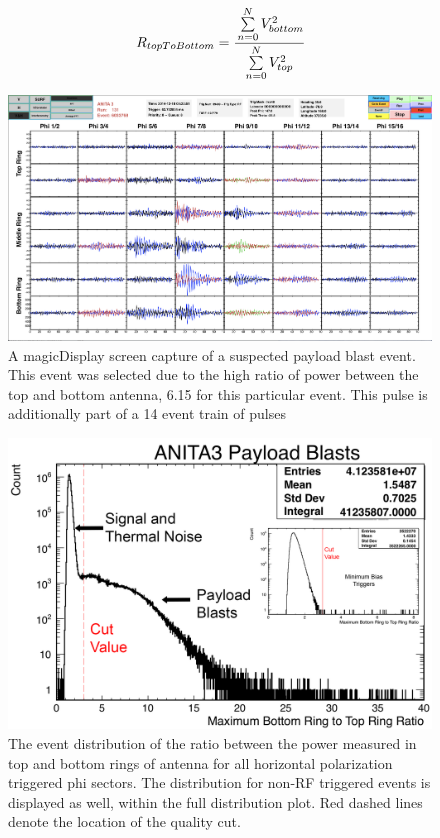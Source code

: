 \begin{equation}
	\label{eqn:topToBottom}
	R_{topToBottom} = \cfrac{\sum\limits_{n=0}^{N} V^{2}_{bottom}}{\sum\limits_{n=0}^{N} V^{2}_{top}}
\end{equation}
		
\begin{figure}
	\label{fig:payloadBlast}
	\centering
	\includegraphics[height=0.5\textheight]{figures/payloadBlast}
	\caption{A magicDisplay screen capture of a suspected payload blast event.  This event was selected due to the high ratio of power between the top and bottom antenna, 6.15 for this particular event.  This pulse is additionally part of a 14 event train of pulses}
\end{figure}

\begin{figure}
	\label{fig:payloadBlastDist}
	\centering
	\includegraphics[height=0.5\textheight]{figures/payloadBlastDistribution}
	\caption{The event distribution of the ratio between the power measured in top and bottom rings of antenna for all horizontal polarization triggered phi sectors.  The distribution for non-RF triggered events is displayed as well, within the full distribution plot.  Red dashed lines denote the location of the quality cut.}
\end{figure}
	
